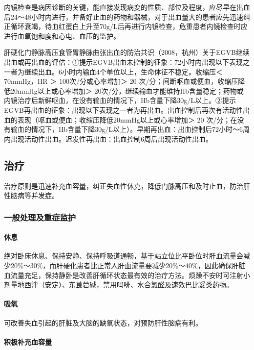 内镜检查是病因诊断的关键，能直接发现病变的性质、部位及程度，应尽早在出血后24～48小时内进行，并备好止血的药物和器械，对于出血量大的患者应先迅速纠正循环衰竭，待血红蛋白上升至70g/L后再进行内镜检查，危重患者内镜检查时应进行血氧饱和度和心电、血压的监护。

肝硬化门静脉高压食管胃静脉曲张出血的防治共识（2008，杭州）关于EGVB继续出血或再出血的评估：①提示EGVB出血未控制的征象：72小时内出现以下表现之一者为继续出血。6小时内输血4个单位以上，生命体征不稳定。收缩压＜
70mmHg，HR ＞ 100次/分或心率增加＞ 20
次/分；间断呕血或便血，收缩压降低20mmHg以上或心率增加＞
20次/分，继续输血才能维持Hb含量稳定；药物或内镜治疗后新鲜呕血，在没有输血的情况下，Hb含量下降30g/L以上。②提示EGVB再出血的征象：出现以下表现之一者为再出血。出血控制后再次有活动性出血的表现（呕血或便血；收缩压降低20mmHg以上或心率增加＞
20
次/分；在没有输血的情况下，Hb含量下降30g/L以上）。早期再出血：出血控制后72小时～6周内出现活动性出血。迟发性再出血：出血控制6周后出现活动性出血。

\subsection{治疗}

治疗原则是迅速补充血容量，纠正失血性休克，降低门脉高压和及时止血，防治肝性脑病等并发症。

\subsubsection{一般处理及重症监护}

\paragraph{休息}

绝对卧床休息、保持安静、保持呼吸道通畅，基于站立位比平卧位时肝血流量会减少20\%～30\%，而肝硬化患者比正常人肝血流量要减少20\%～40\%，因此确保肝脏血流量充足，保持静卧是改善肝循环状态最有效的治疗方法。烦躁不安时可注射小剂量地西泮（安定）、东莨菪碱，禁用吗啡、水合氯醛及速效巴比妥类药物。

\paragraph{吸氧}

可改善失血引起的肝脏及大脑的缺氧状态，对预防肝性脑病有利。

\paragraph{积极补充血容量}

